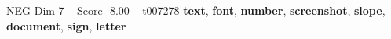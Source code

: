 \begin{textsample}{NEG Dim 7 – Score -8.00 – t007278}  \label{ex:f7_neg_005}
\textbf{text}, \textbf{font}, \textbf{number}, \textbf{screenshot}, \textbf{slope}, \textbf{document}, \textbf{sign}, \textbf{letter}

\end{textsample}
